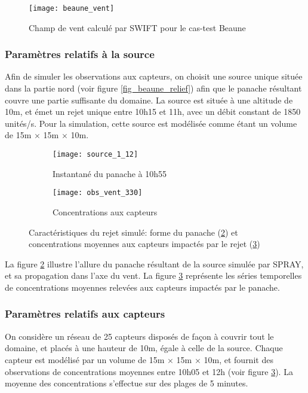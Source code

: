 \begin{figure}[h!]
	\centering
	\texttt{[image: beaune\_vent]}
	\caption{Champ de vent calculé par SWIFT pour le cas-test Beaune}
	\label{fig_beaune_vent}
\end{figure}


\subsubsection{Paramètres relatifs à la source}

Afin de simuler les observations aux capteurs, on choisit une source unique située dans la partie nord (voir figure \ref{fig_beaune_relief}) afin que le panache résultant couvre une partie suffisante du domaine. La source est située à une altitude de 10m, et émet un rejet unique entre 10h15 et 11h, avec un débit constant de 1850 unités/s. Pour la simulation, cette source est modélisée comme étant un volume de 15m $\times$ 15m $\times$ 10m. \\

\begin{figure}[h!]
	\centering
	\begin{subfigure}[t]{0.5\textwidth}
		\centering
		\texttt{[image: source\_1\_12]}
		\caption{Instantané du panache à 10h55}
		\label{panache}
	\end{subfigure}%
	\centering
	\begin{subfigure}[t]{0.5\textwidth}
		\centering
		\texttt{[image: obs\_vent\_330]}
		\caption{Concentrations aux capteurs}
		\label{series_temporelles}
	\end{subfigure}
	\caption{Caractéristiques du rejet simulé: forme du panache (\ref{panache}) et concentrations moyennes aux capteurs impactés par le rejet (\ref{series_temporelles})}
	\label{fig_rejet_beaune} 
\end{figure}

La figure \ref{panache} illustre l'allure du panache résultant de la source simulée par SPRAY, et sa propagation dans l'axe du vent. La figure \ref{series_temporelles} représente les séries temporelles de concentrations moyennes relevées aux capteurs impactés par le panache.

\subsubsection{Paramètres relatifs aux capteurs}

On considère un réseau de 25 capteurs disposés de façon à couvrir tout le domaine, et placés à une hauteur de 10m, égale à celle de la source. Chaque capteur est modélisé par un volume de 15m $\times$ 15m $\times$ 10m, et fournit des observations de concentrations moyennes entre 10h05 et 12h (voir figure \ref{series_temporelles}). La moyenne des concentrations s'effectue sur des plages de 5 minutes.

